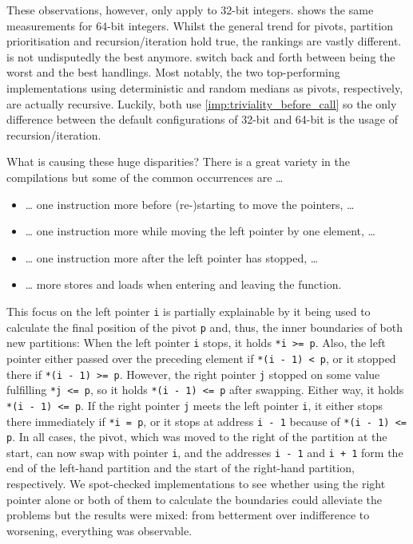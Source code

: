 These observations, however, only apply to 32-bit integers.
 shows the same measurements for 64-bit integers.
Whilst the general trend for pivots, partition prioritisation and recursion/iteration hold true, the rankings are vastly different.
 is not undisputedly the best anymore.
 switch back and forth between being the worst and the best handlings.
Most notably, the two top-performing implementations using deterministic and random medians as pivots, respectively, are actually recursive.
Luckily, both use \cref{imp:triviality_before_call} so the only difference between the default configurations of 32-bit and 64-bit \QS{} is the usage of recursion/iteration.

What is causing these huge disparities?
There is a great variety in the compilations but some of the common occurrences are \dots{}
\begin{itemize}
	\item
	\dots{} one instruction more before (re-)starting to move the pointers, \dots{}

	\item
	\dots{} one instruction more while moving the left pointer by one element, \dots{}

	\item
	\dots{} one instruction more after the left pointer has stopped, \dots{}

	\item
	\dots{} more stores and loads when entering and leaving the function.
\end{itemize}
This focus on the left pointer \lstinline|i| is partially explainable by it being used to calculate the final position of the pivot \lstinline|p| and, thus, the inner boundaries of both new partitions:
When the left pointer \lstinline|i| stops, it holds \lstinline|*i >= p|.
Also, the left pointer either passed over the preceding element if \lstinline|*(i - 1) < p|, or it stopped there if \lstinline|*(i - 1) >= p|.
However, the right pointer \lstinline|j| stopped on some value fulfilling \lstinline|*j <= p|, so it holds \lstinline|*(i - 1) <= p| after swapping.
Either way, it holds \lstinline|*(i - 1) <= p|.
If the right pointer \lstinline|j| meets the left pointer \lstinline|i|, it either stops there immediately if \lstinline|*i = p|, or it stops at address \lstinline|i - 1| because of \lstinline|*(i - 1) <= p|.
In all cases, the pivot, which was moved to the right of the partition at the start, can now swap with pointer \lstinline|i|, and the addresses \lstinline|i - 1| and \lstinline|i + 1| form the end of the left-hand partition and the start of the right-hand partition, respectively.
We spot-checked implementations to see whether using the right pointer alone or both of them to calculate the boundaries could alleviate the problems but the results were mixed:
from betterment over indifference to worsening, everything was observable.

